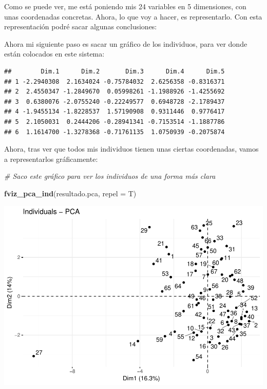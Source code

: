 \documentclass[]{article}
\newenvironment{Shaded}{\begin{snugshade}}{\end{snugshade}}
\newcommand{\CommentTok}[1]{\textcolor[rgb]{0.56,0.35,0.01}{\textit{#1}}}
\newcommand{\DataTypeTok}[1]{\textcolor[rgb]{0.13,0.29,0.53}{#1}}
\newcommand{\KeywordTok}[1]{\textcolor[rgb]{0.13,0.29,0.53}{\textbf{#1}}}
\newcommand{\NormalTok}[1]{#1}
\newcommand{\OperatorTok}[1]{\textcolor[rgb]{0.81,0.36,0.00}{\textbf{#1}}}
\begin{document}
Como se puede ver, me está poniendo mis 24 variables en 5 dimensiones,
con unas coordenadas concretas. Ahora, lo que voy a hacer, es
representarlo. Con esta representación podré sacar algunas conclusiones:

Ahora mi siguiente paso es sacar un gráfico de los individuos, para ver
donde están colocados en este sistema:

\begin{Shaded}
\end{Shaded}

\begin{verbatim}
##        Dim.1      Dim.2       Dim.3      Dim.4      Dim.5
## 1 -2.2940308  2.1634024 -0.75784032  2.6256358 -0.8316371
## 2  2.4550347 -1.2849670  0.05998261 -1.1988926 -1.4255692
## 3  0.6380076 -2.0755240 -0.22249577  0.6948728 -2.1789437
## 4 -1.9455134 -1.8228537  1.57190908  0.9311446  0.9776417
## 5  2.1050031  0.2444206 -0.28941341 -0.7153514 -1.1887786
## 6  1.1614700 -1.3278368 -0.71761135  1.0750939 -0.2075874
\end{verbatim}

Ahora, tras ver que todos mis individuos tienen unas ciertas
coordenadas, vamos a representarlos gráficamente:

\begin{Shaded}
\begin{Highlighting}[]
\CommentTok{# Saco este gráfico para ver los individuos de una forma más clara}

\KeywordTok{fviz_pca_ind}\NormalTok{(resultado.pca, }\DataTypeTok{repel =}\NormalTok{ T)}
\end{Highlighting}
\end{Shaded}

\includegraphics{codigo_files/figure-latex/plot_coordendas_individuos-1.pdf}
\end{document}
